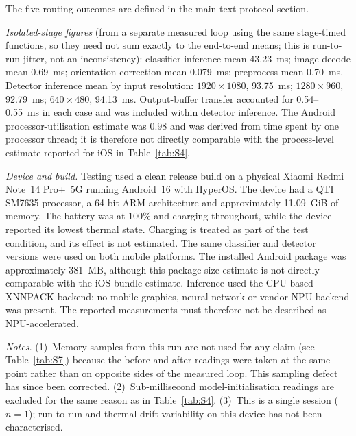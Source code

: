 {\footnotesize
The five routing outcomes are defined in
the main-text protocol section.

\textit{Isolated-stage figures} (from a separate measured loop using the same
stage-timed functions, so they need not sum exactly to the end-to-end means;
this is run-to-run jitter, not an inconsistency): classifier inference mean
43.23~ms; image decode mean 0.69~ms; orientation-correction mean 0.079~ms;
preprocess mean 0.70~ms. Detector inference mean by input resolution:
$1920\times1080$, 93.75~ms; $1280\times960$, 92.79~ms; $640\times480$,
94.13~ms. Output-buffer transfer accounted for 0.54--0.55~ms in each case and was included
within detector inference. The Android processor-utilisation estimate was
0.98 and was derived from time spent by one processor thread; it is therefore
not directly comparable with the process-level estimate reported for iOS in
Table~\ref{tab:S4}.

\textit{Device and build.} Testing used a clean release build on a physical
Xiaomi Redmi Note~14 Pro+~5G running Android~16 with HyperOS. The device had a
QTI SM7635 processor, a 64-bit ARM architecture and approximately 11.09~GiB
of memory. The battery was at 100\% and charging throughout, while the device
reported its lowest thermal state. Charging is treated as part of the test
condition, and its effect is not estimated. The same classifier and detector
versions were used on both mobile platforms. The installed Android package
was approximately 381~MB, although this package-size estimate is not directly
comparable with the iOS bundle estimate. Inference used the CPU-based XNNPACK
backend; no mobile graphics, neural-network or vendor NPU backend was present.
The reported measurements must therefore not be described as NPU-accelerated.

\textit{Notes.} (1)~Memory samples from this run are not used for any claim
(see Table~\ref{tab:S7}) because the before and after readings were taken at
the same point rather than on opposite sides of the measured loop. This
sampling defect has since been corrected. (2)~Sub-millisecond
model-initialisation readings are excluded for the same reason as in
Table~\ref{tab:S4}. (3)~This is a single session
($n = 1$); run-to-run and thermal-drift variability on this device has not
been characterised.
\par}
\tabletail
